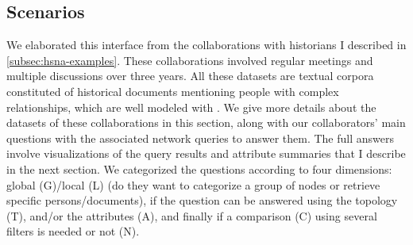 \subsection{Scenarios}

We elaborated this interface from the collaborations with historians I described in \autoref{subsec:hsna-examples}.
These collaborations involved regular meetings and multiple discussions over three years.
All these datasets are textual corpora constituted of historical documents mentioning people with complex relationships, which are well modeled with \modelplural.
We give more details about the datasets of these collaborations in this section, along with our collaborators' main questions with the associated network queries to answer them.
The full answers involve visualizations of the query results and attribute summaries that I describe in the next section.
We categorized the questions according to four dimensions: global (G)/local (L) (do they want to categorize a group of nodes or retrieve specific persons/documents), if the question can be answered using the topology (T), and/or the attributes (A), and finally if a comparison (C) using several filters is needed or not (N).

